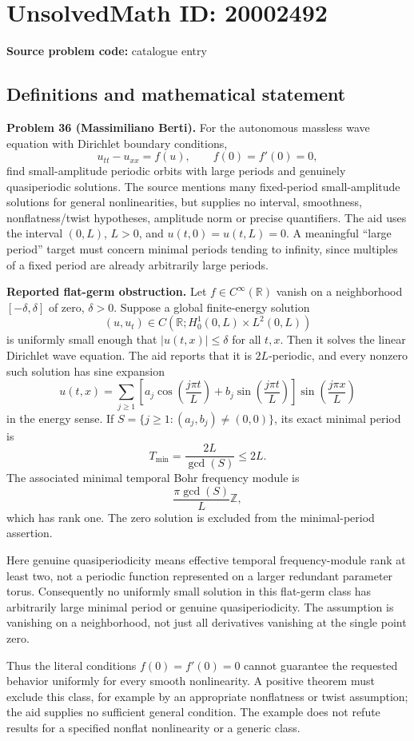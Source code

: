 \documentclass[11pt]{article}
\newcommand{\Z}{\mathbb{Z}}
\newcommand{\R}{\mathbb{R}}
\begin{document}
\section*{UnsolvedMath ID: 20002492}
\textbf{Source problem code:} catalogue entry
\subsection{Definitions and mathematical statement}
\textbf{Problem 36 (Massimiliano Berti).} For the autonomous massless wave equation with Dirichlet boundary conditions,
\[
 u_{tt}-u_{xx}=f(u),\qquad f(0)=f'(0)=0,
\]
find small-amplitude periodic orbits with large periods and genuinely quasiperiodic solutions. The source mentions many fixed-period small-amplitude solutions for general nonlinearities, but supplies no interval, smoothness, nonflatness/twist hypotheses, amplitude norm or precise quantifiers. The aid uses the interval \((0,L)\), \(L>0\), and \(u(t,0)=u(t,L)=0\). A meaningful ``large period'' target must concern minimal periods tending to infinity, since multiples of a fixed period are already arbitrarily large periods.

\textbf{Reported flat-germ obstruction.} Let \(f\in C^\infty(\R)\) vanish on a neighborhood \([-\delta,\delta]\) of zero, \(\delta>0\). Suppose a global finite-energy solution
\[
 (u,u_t)\in C(\R;H_0^1(0,L)\times L^2(0,L))
\]
is uniformly small enough that \(|u(t,x)|\leq\delta\) for all \(t,x\). Then it solves the linear Dirichlet wave equation. The aid reports that it is \(2L\)-periodic, and every nonzero such solution has sine expansion
\[
 u(t,x)=\sum_{j\geq1}\left[a_j\cos\left(\frac{j\pi t}{L}\right)
 +b_j\sin\left(\frac{j\pi t}{L}\right)\right]
 \sin\left(\frac{j\pi x}{L}\right)
\]
in the energy sense. If \(S=\{j\geq1:(a_j,b_j)\ne(0,0)\}\), its exact minimal period is
\[
 T_{\min}=\frac{2L}{\gcd(S)}\leq2L.
\]
The associated minimal temporal Bohr frequency module is
\[
 \frac{\pi\gcd(S)}{L}\Z,
\]
which has rank one. The zero solution is excluded from the minimal-period assertion.

Here genuine quasiperiodicity means effective temporal frequency-module rank at least two, not a periodic function represented on a larger redundant parameter torus. Consequently no uniformly small solution in this flat-germ class has arbitrarily large minimal period or genuine quasiperiodicity. The assumption is vanishing on a neighborhood, not just all derivatives vanishing at the single point zero.

Thus the literal conditions \(f(0)=f'(0)=0\) cannot guarantee the requested behavior uniformly for every smooth nonlinearity. A positive theorem must exclude this class, for example by an appropriate nonflatness or twist assumption; the aid supplies no sufficient general condition. The example does not refute results for a specified nonflat nonlinearity or a generic class.
\end{document}
